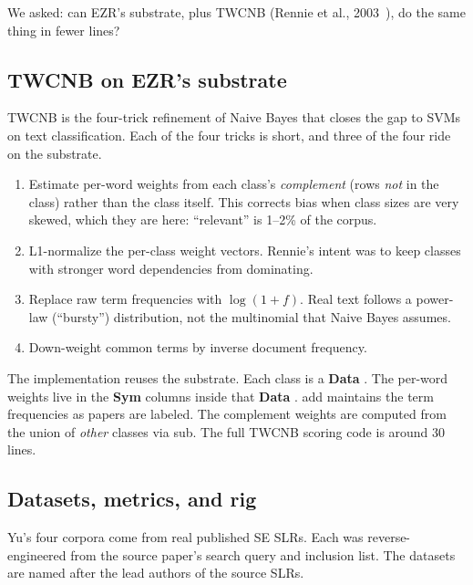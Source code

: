 \documentclass[AMA,STIX2COL]{WileyNJDv5}
\newcommand{\IT}{{\sffamily EZR}}
\newcommand{\cls}[1]{%
  \setlength{\fboxsep}{1.5pt}%
  \colorbox{clsbg}{\sffamily\bfseries{#1}}%
}
\begin{document}
We asked: can \IT{}'s substrate, plus TWCNB (Rennie et al.,
2003~\cite{rennie2003}), do the same thing in fewer lines?

\subsection{TWCNB on \IT{}'s substrate}

TWCNB is the four-trick refinement of Naive Bayes that closes
the gap to SVMs on text classification. Each of the four tricks
is short, and three of the four ride on the substrate.

\begin{enumerate}
\item Estimate per-word weights from each class's
{\em complement} (rows {\em not} in the class) rather than the
class itself. This corrects bias when class sizes are very
skewed, which they are here: ``relevant'' is 1--2\% of the
corpus.
\item L1-normalize the per-class weight vectors. Rennie's
intent was to keep classes with stronger word dependencies from
dominating.
\item Replace raw term frequencies with $\log(1 + f)$. Real text
follows a power-law (``bursty'') distribution, not the
multinomial that Naive Bayes assumes.
\item Down-weight common terms by inverse document frequency.
\end{enumerate}

The implementation reuses the substrate. Each class is a
\cls{Data}. The per-word weights live in the \cls{Sym} columns
inside that \cls{Data}. \textsf{add} maintains the term
frequencies as papers are labeled. The complement weights are
computed from the union of {\em other} classes via \textsf{sub}.
The full TWCNB scoring code is around 30 lines.

\subsection{Datasets, metrics, and rig}

Yu's four corpora come from real published SE SLRs. Each was
reverse-engineered from the source paper's search query and
inclusion list. The datasets are named after the lead authors
of the source SLRs.
\end{document}
